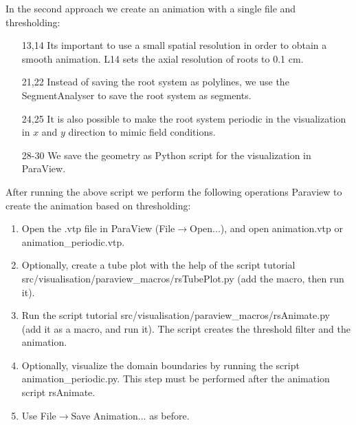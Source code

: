 In the second approach we create an animation with a single file and thresholding:
 
\begin{itemize}
\item[13,14] Its important to use a small spatial resolution in order to obtain a smooth animation. L14 sets the axial resolution of roots to 0.1 cm. 
\item[21,22] Instead of saving the root system as polylines, we use the SegmentAnalyser to save the root system as segments.
\item[24,25] It is also possible to make the root system periodic in the visualization in $x$ and $y$ direction to mimic field conditions.
\item[28-30] We save the geometry as Python script for the visualization in ParaView.
\end{itemize}

After running the above script we perform the following operations Paraview to create the animation based on thresholding:
\begin{enumerate}
 \item Open the .vtp file in ParaView (File$\rightarrow$Open...), and open animation.vtp or animation\_periodic.vtp.
 \item Optionally, create a tube plot with the help of the script tutorial src/visualisation/paraview\_macros/rsTubePlot.py (add the macro, then run it).
 \item Run the script tutorial src/visualisation/paraview\_macros/rsAnimate.py (add it as a macro, and run it). The script creates the threshold filter and the animation. 
 \item Optionally, visualize the domain boundaries by running the script animation\_periodic.py. This step must be performed after the animation script rsAnimate.  
 \item Use File$\rightarrow$Save Animation... as before.
\end{enumerate}

